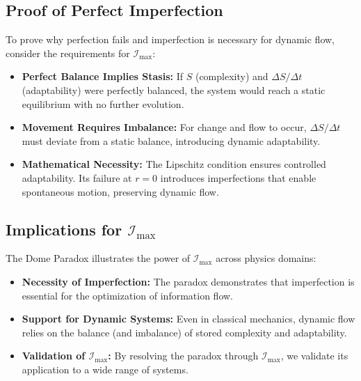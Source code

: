 \documentclass[12pt]{article}
\begin{document}
\subsection{Proof of Perfect Imperfection}
To prove why perfection fails and imperfection is necessary for dynamic flow, consider the requirements for $\mathcal{I}_{\text{max}}$:
\begin{itemize}
    \item \textbf{Perfect Balance Implies Stasis:} If $S$ (complexity) and $\Delta S / \Delta t$ (adaptability) were perfectly balanced, the system would reach a static equilibrium with no further evolution.
    \item \textbf{Movement Requires Imbalance:} For change and flow to occur, $\Delta S / \Delta t$ must deviate from a static balance, introducing dynamic adaptability.
    \item \textbf{Mathematical Necessity:} The Lipschitz condition ensures controlled adaptability. Its failure at $r = 0$ introduces imperfections that enable spontaneous motion, preserving dynamic flow.
\end{itemize}

\subsection{Implications for $\mathcal{I}_{\text{max}}$}
The Dome Paradox illustrates the power of $\mathcal{I}_{\text{max}}$ across physics domains:
\begin{itemize}
    \item \textbf{Necessity of Imperfection:} The paradox demonstrates that imperfection is essential for the optimization of information flow.
    \item \textbf{Support for Dynamic Systems:} Even in classical mechanics, dynamic flow relies on the balance (and imbalance) of stored complexity and adaptability.
    \item \textbf{Validation of $\mathcal{I}_{\text{max}}$:} By resolving the paradox through $\mathcal{I}_{\text{max}}$, we validate its application to a wide range of systems.
\end{itemize}


\end{document}
